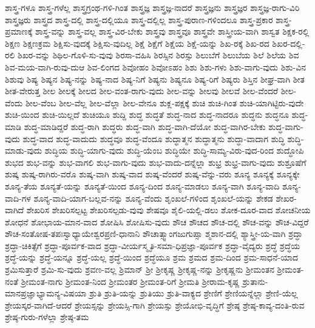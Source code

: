 {ಶಾಸ್ತ್ರ-ಗಳೂ
ಶಾಸ್ತ್ರ-ಗಳೆಲ್ಲ
ಶಾಸ್ತ್ರಗ್ರಂಥ-ಗಳಿ-ಗಿಂತ
ಶಾಸ್ತ್ರಜ್ಞ
ಶಾಸ್ತ್ರಜ್ಞ-ನಾದರೆ
ಶಾಸ್ತ್ರಜ್ಞನು
ಶಾಸ್ತ್ರಜ್ಞರ
ಶಾಸ್ತ್ರಜ್ಞ-ರಾಗು-ವಿರಿ
ಶಾಸ್ತ್ರಜ್ಞರು
ಶಾಸ್ತ್ರದ
ಶಾಸ್ತ್ರ-ದಲ್ಲಿ
ಶಾಸ್ತ್ರ-ದಲ್ಲಿಯೂ
ಶಾಸ್ತ್ರ-ದಲ್ಲಿಲ್ಲ
ಶಾಸ್ತ್ರ-ಪುರಾಣ-ಗಳಿಂದಲೂ
ಶಾಸ್ತ್ರ-ಪ್ರಕಾರ
ಶಾಸ್ತ್ರ-ಪ್ರಮಾಣಕ್ಕೆ
ಶಾಸ್ತ್ರ-ವನ್ನು
ಶಾಸ್ತ್ರ-ವಲ್ಲ
ಶಾಸ್ತ್ರ-ವಿರ-ಬೇಕು
ಶಾಸ್ತ್ರವು
ಶಾಸ್ತ್ರವೂ
ಶಾಸ್ತ್ರವೇ
ಶಾಸ್ತ್ರೀಯ-ವಾಗಿ
ಶಾಸ್ವತ
ಶಿಕ್ಷಕ-ರಲ್ಲಿ
ಶಿಕ್ಷಣ
ಶಿಕ್ಷಣಕ್ರಮ
ಶಿಕ್ಷಿಸು-ವುದಕ್ಕೆ
ಶಿಕ್ಷಿಸು-ವುದಿಲ್ಲ
ಶಿಕ್ಷೆ
ಶಿಕ್ಷೆಗೆ
ಶಿಕ್ಷೆಯ
ಶಿಕ್ಷೆ-ಯನ್ನು
ಶಿಖ-ರಕ್ಕೆ
ಶಿಖ-ರದ
ಶಿಖರ-ದಲ್ಲಿ-ರಲಿ
ಶಿಖರ-ವನ್ನು
ಶಿಥಿಲ-ಗೊಳಿ-ಸು-ವುವು
ಶಿರಸಾ-ವಹಿಸಿ
ಶಿರಸ್ಸಿನ
ಶಿರಸ್ಸು
ಶಿಲುಬೆಗೆ
ಶಿಲುಬೆಯ
ಶಿಲೆ
ಶಿಲೆಯ
ಶಿವ
ಶಿವ-ಮಯ-ವಾಗಿ-ರುವು-ದುಆ
ಶಿವ-ಲಿಂಗದ
ಶಿವೋಹಂ
ಶಿವೋಽಹಂ
ಶಿಶು
ಶಿಶು-ಗಳು
ಶಿಶು-ವಾಗು-ವುದು
ಶಿಶು-ವಿನ
ಶಿಶುವು
ಶಿಷ್ಯ
ಶಿಷ್ಯನ
ಶಿಷ್ಯ-ನನ್ನು
ಶಿಷ್ಯ-ನಾದ
ಶಿಷ್ಯ-ನಿಗೆ
ಶಿಷ್ಯನು
ಶಿಷ್ಯನೂ
ಶಿಷ್ಯ-ರಿಗೆ
ಶಿಷ್ಯರು
ಶಿಸ್ತಿನ
ಶೀಘ್ರ-ವಾಗಿ
ಶೀತ
ಶೀತ-ವೇರುತ್ತ
ಶೀಲ
ಶೀಲಕ್ಕೆ
ಶೀಲದ
ಶೀಲ-ವಂತ-ರಾಗು-ವುದು
ಶೀಲ-ವನ್ನು
ಶೀಲವು
ಶೀಲವೆ
ಶೀಲ-ವೆಂದರೆ
ಶೀಲ-ವೆಂದು
ಶೀಲ-ವೆಂಬ
ಶೀಲ-ವೆಲ್ಲ
ಶೀಲ-ವೆಲ್ಲಾ
ಶೀಲ-ವೇನೂ
ಶುಕ್ಲ-ಪಕ್ಷಕ್ಕೆ
ಶುಚಿ
ಶುಚಿ-ಗಿಂತ
ಶುಚಿ-ಯಾಗಿಟ್ಟಿರು-ವುದೇ
ಶುಚಿ-ಯಿಂದ
ಶುಚಿ-ಯಿಲ್ಲದೆ
ಶುಚಿಯೂ
ಶುದ್ದಿ
ಶುದ್ಧ
ಶುದ್ಧತೆ
ಶುದ್ಧ-ನಾದ
ಶುದ್ಧ-ನಾದರೂ
ಶುದ್ಧನು
ಶುದ್ಧನೂ
ಶುದ್ಧ-ಮಾಡಿ
ಶುದ್ಧ-ಮಾಡಿದ್ದರೆ
ಶುದ್ಧ-ರಾಗಿ
ಶುದ್ಧರು
ಶುದ್ಧ-ವಾಗಿ
ಶುದ್ಧ-ವಾಗಿ-ದೆಯೋ
ಶುದ್ಧ-ವಾಗಿರ-ಬೇಕು
ಶುದ್ಧ-ವಾಗು-ವುದು
ಶುದ್ಧ-ವಾದ
ಶುದ್ಧ-ವಾದುದು
ಶುದ್ಧವೂ
ಶುದ್ಧ-ವೆಂದೂ
ಶುದ್ಧಾತ್ಮನ
ಶುದ್ಧಾತ್ಮನು
ಶುದ್ಧಾ-ವಾದಾಗ
ಶುದ್ಧಿ
ಶುದ್ಧಿ-ಮಾಡು-ವುದು
ಶುದ್ಧಿಯ
ಶುದ್ಧಿ-ಯಾಗು-ವುದು
ಶುದ್ಧಿ-ಯೆಂಬ
ಶುದ್ಧಿಯೇ
ಶುದ್ಧಿ-ಸಾಮ್ಯ-ವಿರು-ವುದ-ರಿಂದ
ಶುದ್ಧೋಪಿ
ಶುಭದ
ಶುಭ-ವನ್ನು
ಶುಭ-ವಾಗಲಿ
ಶುಭ-ವಾಗು-ವುದು
ಶುಭ-ವಾದು-ದನ್ನೆಲ್ಲಾ
ಶುಭ್ರ
ಶುಭ್ರ-ವಾಗು-ವುದು
ಶುಶ್ರೂಷೆಗೆ
ಶುಷ್ಕ
ಶುಷ್ಕ-ರಾಗಿರು-ವರೊ
ಶುಷ್ಕ-ವಾಗಿ
ಶುಷ್ಕ-ವಾದ
ಶುಷ್ಕ-ವೆಂದರೆ
ಶುಷ್ಕ-ವೆನ್ನು-ವರು
ಶೂನ್ಯ
ಶೂನ್ಯಕ್ಕೆ
ಶೂನ್ಯಕ್ಕೇ
ಶೂನ್ಯ-ತೆಯ
ಶೂನ್ಯತೆ-ಯನ್ನು
ಶೂನ್ಯತೆ-ಯಿಂದ
ಶೂನ್ಯ-ದಿಂದ
ಶೂನ್ಯ-ಮಾಡಲು
ಶೂನ್ಯ-ವಾಗಿ
ಶೂನ್ಯ-ವಾದಿ
ಶೂನ್ಯ-ವಾದಿ-ಗಳ
ಶೂನ್ಯ-ವಾದಿ-ಯಾಗ-ಬಲ್ಲವ-ನನ್ನು
ಶೂನ್ಯ-ವೆಂದು
ಶೃಂಖಲೆ-ಗಳಿಂದ
ಶೃಂಖಲೆ-ಯನ್ನು
ಶೇಕಡ
ಶೇಖರ-ವಾಗಿದೆ
ಶೇಖರಿಸ
ಶೇಖರಿಸಲ್ಪಟ್ಟ
ಶೇಖರಿಸಲ್ಪಡು-ವುವು
ಶೇಷವೂ
ಶೈಲಿ-ಯಲ್ಲಿ-ಡಲು
ಶೋಕ-ದೂರ-ವಾದ
ಶೋಚನೀಯ
ಶೋಧನೆ
ಶೋಭಾಯ-ಮಾನ-ವಾದ
ಶೋಷಿಸಿ
ಶೋಷಿಸು-ವುದು
ಶೌಚ
ಶೌಚದ
ಶೌಚ-ದಲ್ಲಿ
ಶೌಚ-ವನ್ನು
ಶೌಚ-ವಿದ್ದರೆ
ಶೌಚ-ಸಂತೋಷ-ತಪಃಸ್ವಾಧ್ಯಾಯೇಶ್ವರಪ್ರಣಿ-ಧಾನಾನಿ
ಶೌಚಾತ್ಸ್ವಾಂಗಜುಗುಪ್ಸಾ
ಶ್ಮಶಾನ-ದಲ್ಲಿ
ಶ್ಯಾಸ್ತ್ರೀ-ಯ-ವಾಗಿ
ಶ್ರದ್ಧಾ
ಶ್ರದ್ಧಾ-ಚಿಕಿತ್ಸೆಗೆ
ಶ್ರದ್ಧಾ-ಪೂರ್ವಕ-ವಾದ
ಶ್ರದ್ಧಾ-ವೀರ್ಯಸ್ಮೃತಿ-ಸಮಾ-ಧಿಪ್ರಜ್ಞಾ-ಪೂರ್ವಕ
ಶ್ರದ್ಧಾ-ವೈದ್ಯರು
ಶ್ರದ್ಧೆ
ಶ್ರದ್ಧೆಯ
ಶ್ರದ್ಧೆ-ಯನ್ನು
ಶ್ರದ್ಧೆ-ಯನ್ನೂ
ಶ್ರದ್ಧೆ-ಯಲ್ಲ
ಶ್ರದ್ಧೆ-ಯಿಂದ
ಶ್ರದ್ಧೆಯೂ
ಶ್ರಮ
ಶ್ರಮದ
ಶ್ರಮ-ದಿಂದ
ಶ್ರಮ-ಸಾಧನೆ-ಯಾದ
ಶ್ರಮಿಸುತ್ತಾರೆ
ಶ್ರಮಿ-ಸು-ವುದು
ಶ್ರವಣ-ವಲ್ಲ
ಶ್ರಿಮಾನ್
ಶ್ರೀ
ಶ್ರೀಕೃಷ್ಣ
ಶ್ರೀಕೃಷ್ಣ-ನನ್ನು
ಶ್ರೀಕೃಷ್ಣನು
ಶ್ರೀಮಂತನ
ಶ್ರೀಮಂತ-ನಂತೆ
ಶ್ರೀಮಂತ-ನಾಗು
ಶ್ರೀಮಂತ-ನಿಂದ
ಶ್ರೀಮಂತರ
ಶ್ರೀಮಂತ-ರಿಗೆ
ಶ್ರೀಮತಿ
ಶ್ರೀರಾಮ-ಕೃಷ್ಣ
ಶ್ರುತಾನು-ಮಾನಪ್ರಜ್ಞಾಭ್ಯಾಮನ್ಯ-ವಿಷಯಾ
ಶ್ರುತಿ
ಶ್ರುತಿ-ಯನ್ನು
ಶ್ರುತಿಯು
ಶ್ರುತಿ-ವಾಕ್ಯದ
ಶ್ರೇಣಿಗೆ
ಶ್ರೇಣಿಯನ್ನೆಲ್ಲಾ
ಶ್ರೇಣಿ-ಯೆಲ್ಲ
ಶ್ರೇಯಸ್ಕರ-ವಾಗಿದೆ-ಆದರೆ
ಶ್ರೇಯಸ್ಸನ್ನು
ಶ್ರೇಯಸ್ಸಿ-ಗಾಗಿ
ಶ್ರೇಯಸ್ಸು
ಶ್ರೇಯೋಭಿ-ವೃದ್ಧಿಗೆ
ಶ್ರೇಷ್ಠ
ಶ್ರೇಷ್ಠ-ಕಾವ್ಯ-ದಂತಿ-ರುವ
ಶ್ರೇಷ್ಠ-ಗುರು-ಗಳೆಲ್ಲಾ
ಶ್ರೇಷ್ಠ-ತಮ
}
